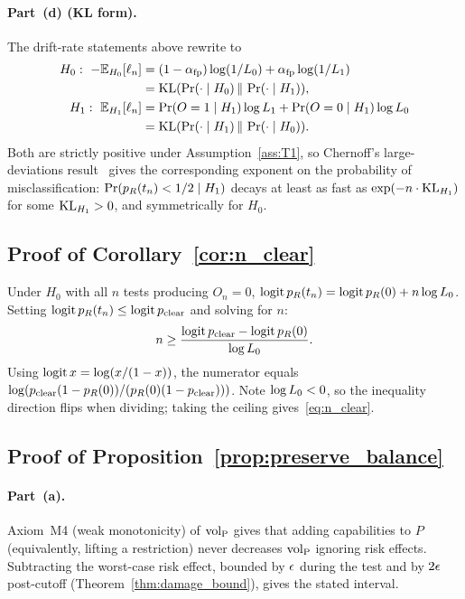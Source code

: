 \paragraph{Part~(d) (KL form).}
The drift-rate statements above rewrite to
\begin{align*}
H_0: \ -\mathbb{E}_{H_0}[\ell_n]
  &= (1 - \alpha_{\mathrm{fp}}) \log(1/L_0) + \alpha_{\mathrm{fp}} \log(1/L_1) \\
  &= \mathrm{KL}(\Pr(\cdot \mid H_0) \,\|\, \Pr(\cdot \mid H_1)), \\
H_1: \ \mathbb{E}_{H_1}[\ell_n]
  &= \Pr(O = 1 \mid H_1) \log L_1
    + \Pr(O = 0 \mid H_1) \log L_0 \\
  &= \mathrm{KL}(\Pr(\cdot \mid H_1) \,\|\, \Pr(\cdot \mid H_0)).
\end{align*}
Both are strictly positive under Assumption~\ref{ass:T1}, so
Chernoff's large-deviations result~\citep{chernoff1952measure}
gives the corresponding exponent on the probability of
misclassification: $\Pr(p_R(t_n) < 1/2 \mid H_1)$ decays at
least as fast as $\exp(-n \cdot \mathrm{KL}_{H_1})$ for some
$\mathrm{KL}_{H_1} > 0$, and symmetrically for $H_0$.

\subsection{Proof of Corollary~\ref{cor:n_clear}}

Under $H_0$ with all $n$ tests producing $O_n = 0$,
$\operatorname{logit} p_R(t_n) = \operatorname{logit} p_R(0) + n \log L_0$.  Setting
$\operatorname{logit} p_R(t_n) \leq \operatorname{logit} p_{\mathrm{clear}}$ and solving
for $n$:
$$
n \geq \frac{\operatorname{logit} p_{\mathrm{clear}} - \operatorname{logit} p_R(0)}
             {\log L_0}.
$$
Using $\operatorname{logit} x = \log(x/(1-x))$, the numerator equals
$\log(p_{\mathrm{clear}}(1 - p_R(0)) / (p_R(0)(1 -
p_{\mathrm{clear}})))$.  Note $\log L_0 < 0$, so the
inequality direction flips when dividing; taking the ceiling
gives~\eqref{eq:n_clear}.

\subsection{Proof of Proposition~\ref{prop:preserve_balance}}
\label{app:proof_preserve_balance}

\paragraph{Part~(a).}
Axiom~M4 (weak monotonicity) of ${\operatorname{vol}_{\mathrm{P}}}$
\citep[Proposition~1]{lasser2026poset} gives that adding
capabilities to $P$ (equivalently, lifting a restriction)
never decreases ${\operatorname{vol}_{\mathrm{P}}}$ ignoring risk effects.  Subtracting
the worst-case risk effect, bounded by $\epsilon$ during
the test and by $2\epsilon$ post-cutoff
(Theorem~\ref{thm:damage_bound}), gives the stated interval.

